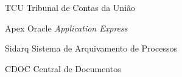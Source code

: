\begin{siglas}
  
  \item[TCU] Tribunal de Contas da União
  \item[Apex] Oracle \textit{Application Express}
  \item[Sidarq] Sistema de Arquivamento de Processos
  \item[CDOC] Central de Documentos
   
\end{siglas}
